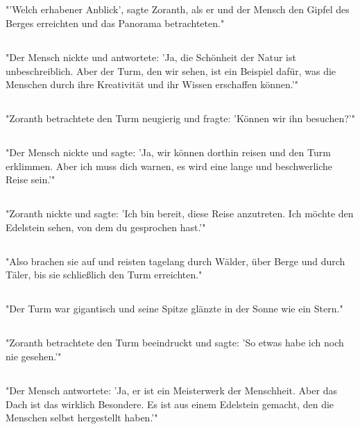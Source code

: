 \documentclass{article}
\begin{document}
\subsection{}
"'Welch erhabener Anblick', sagte Zoranth, als er und der Mensch den Gipfel des Berges erreichten und das Panorama betrachteten."
\subsection{}
"Der Mensch nickte und antwortete: 'Ja, die Schönheit der Natur ist unbeschreiblich. Aber der Turm, den wir sehen, ist ein Beispiel dafür, was die Menschen durch ihre Kreativität und ihr Wissen erschaffen können.'"
\subsection{}
"Zoranth betrachtete den Turm neugierig und fragte: 'Können wir ihn besuchen?'"
\subsection{}
"Der Mensch nickte und sagte: 'Ja, wir können dorthin reisen und den Turm erklimmen. Aber ich muss dich warnen, es wird eine lange und beschwerliche Reise sein.'"
\subsection{}
"Zoranth nickte und sagte: 'Ich bin bereit, diese Reise anzutreten. Ich möchte den Edelstein sehen, von dem du gesprochen hast.'"
\subsection{}
"Also brachen sie auf und reisten tagelang durch Wälder, über Berge und durch Täler, bis sie schließlich den Turm erreichten."
\subsection{}
"Der Turm war gigantisch und seine Spitze glänzte in der Sonne wie ein Stern."
\subsection{}
"Zoranth betrachtete den Turm beeindruckt und sagte: 'So etwas habe ich noch nie gesehen.'"
\subsection{}
"Der Mensch antwortete: 'Ja, er ist ein Meisterwerk der Menschheit. Aber das Dach ist das wirklich Besondere. Es ist aus einem Edelstein gemacht, den die Menschen selbst hergestellt haben.'"
\end{document}
